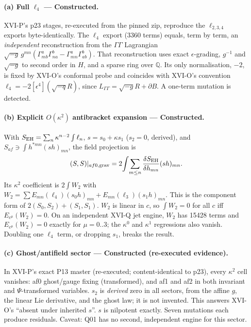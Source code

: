 \paragraph{(a) Full $\ell_4$ --- Constructed.} XVI-P's p23 stages, re-executed from the pinned zip, reproduce the
$\ell_{2,3,4}$ exports byte-identically. The $\ell_4$ export (3360 terms) equals, term by term, an
\emph{independent} reconstruction from the $\Gamma\Gamma$ Lagrangian
$\sqrt{-g}\,g^{mn}(\Gamma^a_{mb}\Gamma^b_{na}-\Gamma^a_{mn}\Gamma^b_{ab})$. That reconstruction uses exact
$\epsilon$-grading, $g^{-1}$ and $\sqrt{-g}$ to second order in $H$, and a sparse ring over $\mathbb Q$. Its only
normalisation, $-2$, is fixed by XVI-O's conformal probe and coincides with XVI-O's convention
$\ell_4=-2[\epsilon^4](\sqrt{-q}R)$, since $L_{\Gamma\Gamma}=\sqrt{-g}R+\partial B$. A one-term mutation is detected.

\paragraph{(b) Explicit $O(\kappa^2)$ antibracket expansion --- Constructed.} With $S_{\rm EH}=\sum_n\kappa^{n-2}\int\ell_n$,
$s=s_0+\kappa s_1$ ($s_2=0$, derived), and $S_{af}\ni\int h^{*mn}(sh)_{mn}$, the field projection is
\[(S,S)|_{af0,{\rm grav}}=2\!\int\!\sum_{m\le n}\frac{\delta S_{\rm EH}}{\delta h_{mn}}(sh)_{mn}.\]
Its $\kappa^2$ coefficient is $2\int W_2$ with
$W_2=\sum E_{mn}(\ell_4)(s_0h)_{mn}+E_{mn}(\ell_3)(s_1h)_{mn}$. This is the component form of $2(S_0,S_2)+(S_1,S_1)$.
$W_2$ is linear in $c$, so $\int W_2=0$ for all $c$ iff $E_{c^\mu}(W_2)=0$. On an independent XVI-Q jet engine,
$W_2$ has 15428 terms and $E_{c^\mu}(W_2)=0$ exactly for $\mu=0..3$; the $\kappa^0$ and $\kappa^1$ regressions
also vanish. Doubling one $\ell_4$ term, or dropping $s_1$, breaks the result.

\paragraph{(c) Ghost/antifield sector --- Constructed (re-executed evidence).} In XVI-P's exact P13 master
(re-executed; content-identical to p23), every $\kappa^2$ cell vanishes: af0 ghost/gauge fixing (transformed), and
af1 and af2 in both invariant and $\Psi$-transformed variables. $s_2$ is \emph{derived} zero in all sectors, from
the affine $g$, the linear Lie derivative, and the ghost law; it is not invented. This answers XVI-O's ``absent under
inherited $s$''. $s$ is nilpotent exactly. Seven mutations each produce residuals. Caveat: Q01 has no second,
independent engine for this sector.

